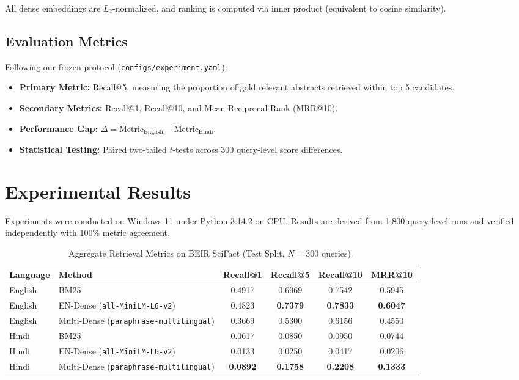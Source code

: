 \documentclass[11pt,a4paper]{article}
\begin{document}
All dense embeddings are $L_2$-normalized, and ranking is computed via inner product (equivalent to cosine similarity).

\subsection{Evaluation Metrics}
Following our frozen protocol (\texttt{configs/experiment.yaml}):
\begin{itemize}
    \item \textbf{Primary Metric:} Recall@5, measuring the proportion of gold relevant abstracts retrieved within top 5 candidates.
    \item \textbf{Secondary Metrics:} Recall@1, Recall@10, and Mean Reciprocal Rank (MRR@10).
    \item \textbf{Performance Gap:} $\Delta = \text{Metric}_{\text{English}} - \text{Metric}_{\text{Hindi}}$.
    \item \textbf{Statistical Testing:} Paired two-tailed $t$-tests across 300 query-level score differences.
\end{itemize}

\section{Experimental Results}
\label{sec:results}

Experiments were conducted on Windows 11 under Python 3.14.2 on CPU. Results are derived from 1,800 query-level runs and verified independently with 100\% metric agreement.

\begin{table}[ht]
\centering
\small
\caption{Aggregate Retrieval Metrics on BEIR SciFact (Test Split, $N = 300$ queries).}
\label{tab:metrics}
\begin{tabular}{llcccc}
\toprule
\textbf{Language} & \textbf{Method} & \textbf{Recall@1} & \textbf{Recall@5} & \textbf{Recall@10} & \textbf{MRR@10} \\
\midrule
English & BM25 & 0.4917 & 0.6969 & 0.7542 & 0.5945 \\
English & EN-Dense (\texttt{all-MiniLM-L6-v2}) & 0.4823 & \textbf{0.7379} & \textbf{0.7833} & \textbf{0.6047} \\
English & Multi-Dense (\texttt{paraphrase-multilingual}) & 0.3669 & 0.5300 & 0.6156 & 0.4550 \\
\midrule
Hindi & BM25 & 0.0617 & 0.0850 & 0.0950 & 0.0744 \\
Hindi & EN-Dense (\texttt{all-MiniLM-L6-v2}) & 0.0133 & 0.0250 & 0.0417 & 0.0206 \\
Hindi & Multi-Dense (\texttt{paraphrase-multilingual}) & \textbf{0.0892} & \textbf{0.1758} & \textbf{0.2208} & \textbf{0.1333} \\
\bottomrule
\end{tabular}
\end{table}
\end{document}
